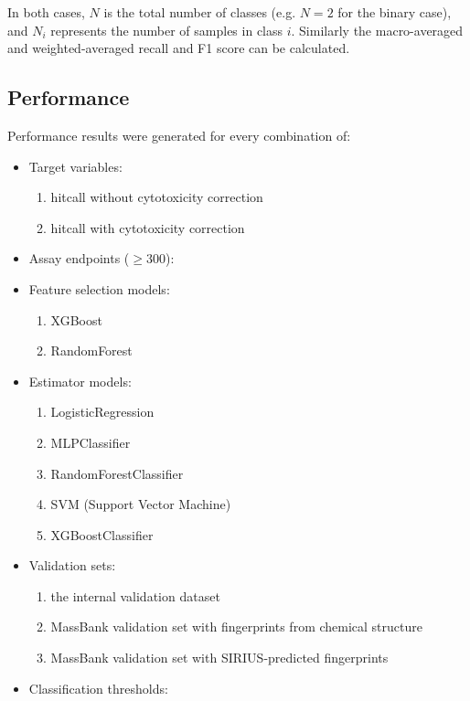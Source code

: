 In both cases, $N$ is the total number of classes (e.g. $N=2$ for the binary case), and $N_i$ represents the number of samples in class $i$. Similarly the macro-averaged and weighted-averaged recall and F1 score can be calculated.


\subsection{Performance}

Performance results were generated for every combination of:

\begin{itemize}
  \item Target variables:
  \begin{enumerate}
    \item hitcall without cytotoxicity correction
    \item hitcall with cytotoxicity correction
  \end{enumerate}
  \item Assay endpoints ($\geq 300$):
  \item Feature selection models:
    \begin{enumerate}
      \item XGBoost
      \item RandomForest
    \end{enumerate}
    \item Estimator models:
    \begin{enumerate}
      \item LogisticRegression
      \item MLPClassifier
      \item RandomForestClassifier
      \item SVM (Support Vector Machine)
      \item XGBoostClassifier
    \end{enumerate}
  \item Validation sets:
    \begin{enumerate}
      \item the internal validation dataset 
      \item MassBank validation set with fingerprints from chemical structure
      \item MassBank validation set with SIRIUS-predicted fingerprints
    \end{enumerate}
  \item Classification thresholds:
    \begin{enumerate}

\end{enumerate}
\end{itemize}
